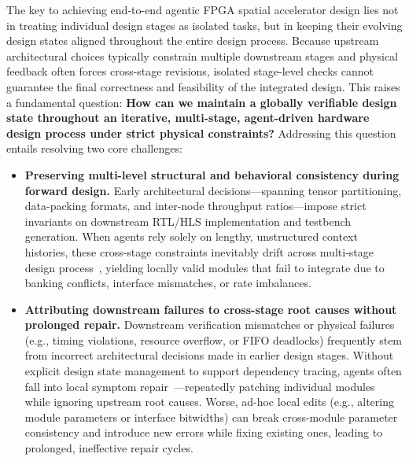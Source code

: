 \documentclass[9pt,conference]{IEEEtran}
\begin{document}
The key to achieving end-to-end agentic FPGA spatial accelerator design lies not in treating individual design stages as isolated tasks, but in keeping their evolving design states aligned throughout the entire design process. Because upstream architectural choices typically constrain multiple downstream stages and physical feedback often forces cross-stage revisions, isolated stage-level checks cannot guarantee the final correctness and feasibility of the integrated design. This raises a fundamental question: \textbf{How can we maintain a globally verifiable design state throughout an iterative, multi-stage, agent-driven hardware design process under strict physical constraints?} Addressing this question entails resolving two core challenges:
\begin{itemize}
\item \textbf{Preserving multi-level structural and behavioral consistency during forward design.} Early architectural decisions—spanning tensor partitioning, data-packing formats, and inter-node throughput ratios—impose strict invariants on downstream RTL/HLS implementation and testbench generation. When agents rely solely on lengthy, unstructured context histories, these cross-stage constraints inevitably drift across multi-stage design process~\cite{lostmiddle,longbench,locomo}, yielding locally valid modules that fail to integrate due to banking conflicts, interface mismatches, or rate imbalances.
\item \textbf{Attributing downstream failures to cross-stage root causes without prolonged repair.} Downstream verification mismatches or physical failures (e.g., timing violations, resource overflow, or FIFO deadlocks) frequently stem from incorrect architectural decisions made in earlier design stages. Without explicit design state management to support dependency tracing, agents often fall into local symptom repair~\cite{swesearch}—repeatedly patching individual modules while ignoring upstream root causes. Worse, ad-hoc local edits (e.g., altering module parameters or interface bitwidths) can break cross-module parameter consistency and introduce new errors while fixing existing ones, leading to prolonged, ineffective repair cycles.
\end{itemize}
\end{document}
